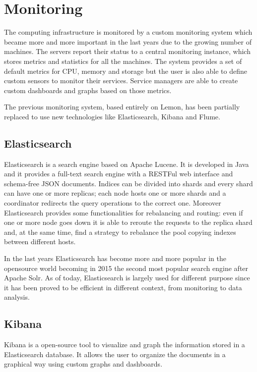 \section{Monitoring}

The computing infrastructure is monitored by a custom monitoring system
which became more and more important in the last years due to the growing
number of machines. The servers report their status to a central
monitoring instance, which stores metrics and statistics for all the
machines. The system provides a set of default metrics for CPU, memory and
storage but the user is also able to define custom sensors to monitor
their services. Service managers are able to create custom dashboards and
graphs based on those metrics.

The previous monitoring system, based entirely on Lemon, has been
partially replaced to use new technologies like Elasticsearch, Kibana and
Flume. 

\subsection{Elasticsearch}

Elasticsearch is a search engine based on Apache Lucene. It is developed
in Java and it provides a full-text search engine with a RESTFul web
interface and schema-free JSON documents. Indices can be divided into
shards and every shard can have one or more replicas; each node hosts one
or more shards and a coordinator redirects the query operations to the
correct one. Moreover Elasticsearch provides some functionalities for
rebalancing and routing: even if one or more node goes down it is able to
reroute the requests to the replica shard and, at the same time, find
a strategy to rebalance the pool copying indexes between different
hosts.

In the last years Elasticsearch has become more and more popular in the
opensource world becoming in 2015 the second most popular search engine
after Apache Solr. As of today, Elasticsearch is largely used for
different purpose since it has been proved to be efficient in different
context, from monitoring to data analysis.

\subsection{Kibana}

Kibana is a open-source tool to visualize and graph the information
stored in a Elasticsearch database. It allows the user to organize the
documents in a graphical way using custom graphs and dashboards.

